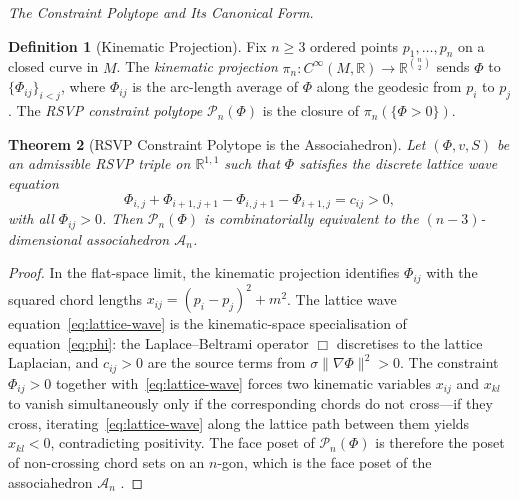 \documentclass[11pt]{article}
\theoremstyle{plain}
\newtheorem{theorem}{Theorem}[section]
\theoremstyle{definition}
\newtheorem{definition}[theorem]{Definition}
\theoremstyle{remark}
\newcommand{\R}{\mathbb{R}}
\newcommand{\Phif}{\Phi}
\newcommand{\vf}{v}
\newcommand{\Sf}{S}
\newcommand{\Assoc}{\mathcal{A}_n}
\begin{document}
\medskip\noindent\textit{The Constraint Polytope and Its Canonical Form.}

\begin{definition}[Kinematic Projection]
Fix $n \geq 3$ ordered points $p_1, \ldots, p_n$ on a closed curve in $M$. The \emph{kinematic projection} $\pi_n: C^\infty(M,\R) \to \R^{\binom{n}{2}}$ sends $\Phif$ to $\{\Phif_{ij}\}_{i < j}$, where $\Phif_{ij}$ is the arc-length average of $\Phif$ along the geodesic from $p_i$ to $p_j$. The \emph{RSVP constraint polytope} $\mathcal{P}_n(\Phif)$ is the closure of $\pi_n(\{\Phif > 0\})$.
\end{definition}

\begin{theorem}[RSVP Constraint Polytope is the Associahedron]
\label{thm:assoc}
Let $(\Phif, \vf, \Sf)$ be an admissible RSVP triple on $\R^{1,1}$ such that $\Phif$ satisfies the discrete lattice wave equation
\begin{equation}
\label{eq:lattice-wave}
  \Phif_{i,j} + \Phif_{i+1,j+1} - \Phif_{i,j+1} - \Phif_{i+1,j} = c_{ij} > 0,
\end{equation}
with all $\Phif_{ij} > 0$. Then $\mathcal{P}_n(\Phif)$ is combinatorially equivalent to the $(n-3)$-dimensional associahedron $\Assoc$.
\end{theorem}

\begin{proof}
In the flat-space limit, the kinematic projection identifies $\Phif_{ij}$ with the squared chord lengths $x_{ij} = (p_i - p_j)^2 + m^2$. The lattice wave equation~\eqref{eq:lattice-wave} is the kinematic-space specialisation of equation~\eqref{eq:phi}: the Laplace--Beltrami operator $\Box$ discretises to the lattice Laplacian, and $c_{ij} > 0$ are the source terms from $\sigma\|\nabla\Phif\|^2 > 0$. The constraint $\Phif_{ij} > 0$ together with~\eqref{eq:lattice-wave} forces two kinematic variables $x_{ij}$ and $x_{kl}$ to vanish simultaneously only if the corresponding chords do not cross---if they cross, iterating~\eqref{eq:lattice-wave} along the lattice path between them yields $x_{kl} < 0$, contradicting positivity. The face poset of $\mathcal{P}_n(\Phif)$ is therefore the poset of non-crossing chord sets on an $n$-gon, which is the face poset of the associahedron $\Assoc$ \cite{Stasheff1963, Loday2004}.
\end{proof}
\end{document}
